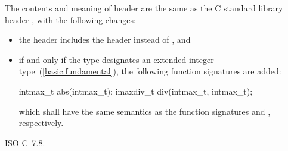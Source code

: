 \pnum
{}%
%
The contents and meaning of header 
are the same as the C standard library header ,
with the following changes:

\begin{itemize}
\item
the header  includes the header  instead
of , and

\item
if and only if the type  designates an extended integer 
type~(\ref{basic.fundamental}), the following function signatures are added:
\begin{codeblock}
intmax_t abs(intmax_t);
imaxdiv_t div(intmax_t, intmax_t);
\end{codeblock}
which shall have the same semantics as the function signatures
 and
, respectively.
\end{itemize}

\xref ISO C~7.8.








